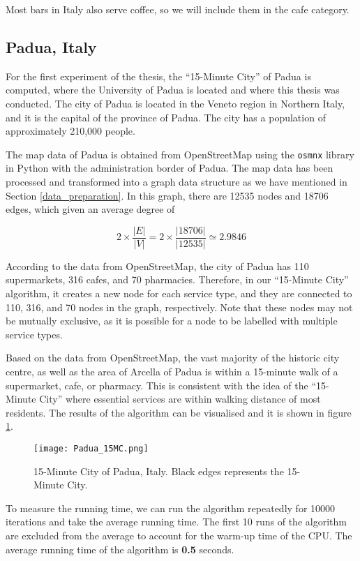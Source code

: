 Most bars in Italy also serve coffee, so we will include them in the cafe category.

\subsection{Padua, Italy}

For the first experiment of the thesis, the ``15-Minute City'' of Padua is computed, where the University of Padua is located and where this thesis was conducted. The city of Padua is located in the Veneto region in Northern Italy, and it is the capital of the province of Padua. The city has a population of approximately 210,000 people.

The map data of Padua is obtained from OpenStreetMap using the \verb|osmnx| library in Python with the administration border of Padua. The map data has been processed and transformed into a graph data structure as we have mentioned in Section \ref{data_preparation}. In this graph, there are 12535 nodes and 18706 edges, which given an average degree of

$$2\times\frac{|E|}{|V|}=2\times\frac{|18706|}{|12535|}\simeq2.9846$$

According to the data from OpenStreetMap, the city of Padua has 110 supermarkets, 316 cafes, and 70 pharmacies. Therefore, in our ``15-Minute City'' algorithm, it creates a new node for each service type, and they are connected to 110, 316, and 70 nodes in the graph, respectively. Note that these nodes may not be mutually exclusive, as it is possible for a node to be labelled with multiple service types.

Based on the data from OpenStreetMap, the vast majority of the historic city centre, as well as the area of Arcella of Padua is within a 15-minute walk of a supermarket, cafe, or pharmacy. This is consistent with the idea of the ``15-Minute City'' where essential services are within walking distance of most residents. The results of the algorithm can be visualised and it is shown in figure \ref{fig:padua_15MC}.

\begin{figure}[htbp]
    \centering
    \texttt{[image: Padua\_15MC.png]}
    \caption{15-Minute City of Padua, Italy. Black edges represents the 15-Minute City.}
    \label{fig:padua_15MC}
\end{figure}

To measure the running time, we can run the algorithm repeatedly for 10000 iterations and take the average running time. The first 10 runs of the algorithm are excluded from the average to account for the warm-up time of the CPU. The average running time of the algorithm is \textbf{0.5} seconds.


